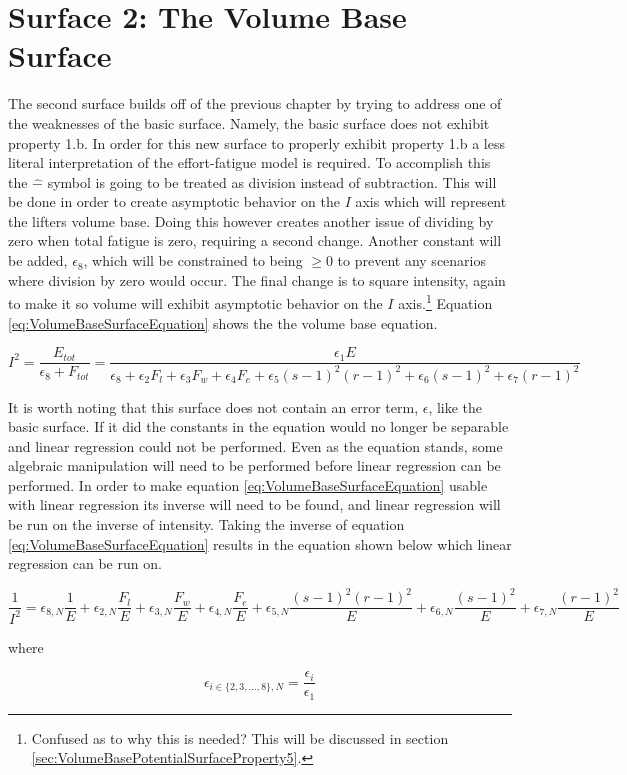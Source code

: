 \chapter{Surface 2: The Volume Base Surface}
\label{sec:PotentialSurfaceTheVolumeBaseSurface}

The second surface builds off of the previous chapter by trying to address one of the weaknesses of the basic surface. Namely, the basic surface does not exhibit property 1.b. In order for this new surface to properly exhibit property 1.b a less literal interpretation of the effort-fatigue model is required. To accomplish this the $\hat{-}$ symbol is going to be treated as division instead of subtraction. This will be done in order to create asymptotic behavior on the $I$ axis which will represent the lifters volume base. Doing this however creates another issue of dividing by zero when total fatigue is zero, requiring a second change. Another constant will be added, $\epsilon_8$, which will be constrained to being $\ge 0$ to prevent any scenarios where division by zero would occur. The final change is to square intensity, again to make it so volume will exhibit asymptotic behavior on the $I$ axis.\footnote{Confused as to why this is needed? This will be discussed in section \ref{sec:VolumeBasePotentialSurfaceProperty5}.} Equation \ref{eq:VolumeBaseSurfaceEquation} shows the the volume base equation.
 
\begin{equation}
	I^2 = \frac{E_{tot}}{\epsilon_8+F_{tot}}= \frac{
		\epsilon_1E
	}{
		\epsilon_8+
		\epsilon_2 F_l+
		\epsilon_3 F_w+
		\epsilon_4 F_e+
		\epsilon_5 (s-1)^2(r-1)^2+
		\epsilon_6 (s-1)^2+
		\epsilon_7 (r-1)^2
	}
	\label{eq:VolumeBaseSurfaceEquation}
\end{equation}

It is worth noting that this surface does not contain an error term, $\epsilon$, like the basic surface. If it did the constants in the equation would no longer be separable and linear regression could not be performed. Even as the equation stands, some algebraic manipulation will need to be performed before linear regression can be performed. In order to make equation \ref{eq:VolumeBaseSurfaceEquation} usable with linear regression its inverse will need to be found, and linear regression will be run on the inverse of intensity. Taking the inverse of equation \ref{eq:VolumeBaseSurfaceEquation} results in the equation shown below which linear regression can be run on.

\begin{minipage}{\textwidth}
	\begin{equation*}
		\frac{1}{I^2}=
			\epsilon_{8,N}\frac{1}{E}+
			\epsilon_{2,N}\frac{F_l}{E}+
			\epsilon_{3,N}\frac{F_w}{E}+
			\epsilon_{4,N}\frac{F_e}{E}+
			\epsilon_{5,N}\frac{(s-1)^2(r-1)^2}{E}+
			\epsilon_{6,N}\frac{(s-1)^2}{E}+
			\epsilon_{7,N}\frac{(r-1)^2}{E}
	\end{equation*}
	\centerline{where}
		\begin{equation*}
			\epsilon_{i\in\{2,3,...,8\},N}=
			\frac{\epsilon_i}{\epsilon_1}
	\end{equation*}
\end{minipage}

